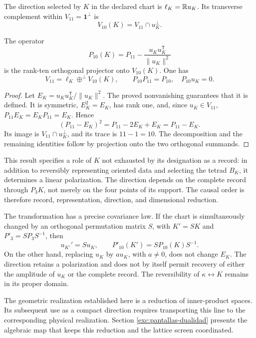 \begin{definition}
The direction selected by \(K\) in the declared chart is
\(\ell_K=\mathbb R u_K\). Its transverse complement within
\(V_{11}=\mathbf1^\perp\) is
\[
 V_{10}(K)=V_{11}\cap u_K^\perp.
\]
\end{definition}

\begin{proposition}
\label{prop:k-reduccion-diez}
The operator
\begin{equation}
 P_{10}(K)=P_{11}
       -\frac{u_Ku_K^{\mathsf T}}{\lVert u_K\rVert^2}
 \label{eq:k-proyector-diez}
\end{equation}
is the rank-ten orthogonal projector onto \(V_{10}(K)\). One has
\[
 V_{11}=\ell_K\mathbin{\oplus^{\perp}}V_{10}(K),
 \qquad P_{10}P_{11}=P_{10},\quad P_{10}u_K=0.
\]
\end{proposition}
\begin{proof}
Let \(E_K=u_Ku_K^{\mathsf T}/\lVert u_K\rVert^2\). The proved
nonvanishing guarantees that it is defined. It is symmetric,
\(E_K^2=E_K\), has rank one, and, since \(u_K\in V_{11}\),
\(P_{11}E_K=E_KP_{11}=E_K\). Hence
\[
 (P_{11}-E_K)^2=P_{11}-2E_K+E_K=P_{11}-E_K.
\]
Its image is \(V_{11}\cap u_K^\perp\), and its trace is \(11-1=10\). The
decomposition and the remaining identities follow by projection onto the two
orthogonal summands.
\end{proof}

This result specifies a role of \(K\) not exhausted by its designation as a
record: in addition to reversibly representing oriented data and selecting
the tetrad \(B_K\), it determines a linear polarization. The direction
depends on the complete record through \(P_3K\), not merely on the four
points of its support. The causal order is therefore record, representation,
direction, and dimensional reduction.

The transformation has a precise covariance law. If the chart is
simultaneously changed by an orthogonal permutation matrix \(S\), with
\(K'=SK\) and \(P'_3=SP_3S^{-1}\), then
\[
 u_{K'}'=Su_K,\qquad P'_{10}(K')=SP_{10}(K)S^{-1}.
\]
On the other hand, replacing \(u_K\) by \(a u_K\), with \(a\ne0\), does not
change \(E_K\). The direction retains a polarization and does not by itself
permit recovery of either the amplitude of \(u_K\) or the complete record.
The reversibility of \(\kappa\leftrightarrow K\) remains in its proper
domain.

The geometric realization established here is a reduction of inner-product
spaces. Its subsequent use as a compact direction requires transporting this
line to the corresponding physical realization. Section
\ref{exc:pantallas-dualidad} presents the algebraic map that keeps this
reduction and the lattice screen coordinated.
